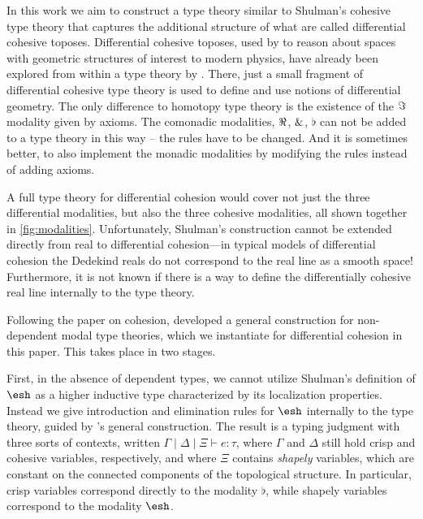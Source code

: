 \documentclass{article}
\begin{document}
In this work we aim to construct a type theory similar to Shulman's cohesive
type theory that captures the additional structure of what are called
differential cohesive toposes.  Differential cohesive toposes, used by \citet{Schreiber2013}
to reason about spaces with geometric structures of interest to modern physics,
have already been explored from within a type theory by \citet{Wellen2017}.
There, just a small fragment of differential cohesive type theory is used to
define and use notions of differential geometry. 
The only difference to homotopy type theory
 is the existence of the $\Im$ modality given by axioms.
The comonadic modalities, $\Re$, $\&$, $\flat$ can not be added to a type theory in this way -- 
the rules have to be changed.
And it is sometimes better, to also implement the monadic modalities by modifying the rules instead of adding axioms.

A full type theory for differential cohesion would cover not just the three
differential modalities, but also the three cohesive modalities, all shown
together in \cref{fig:modalities}. Unfortunately, Shulman's construction cannot
be extended directly from real to differential cohesion---in typical models of
differential cohesion the Dedekind reals do not correspond to the real line as a
smooth space! Furthermore, it is not known if there is a way to define the
differentially cohesive real line internally to the type theory. 

Following the \citeyear{Licata2016} paper on cohesion, \citet{Licata2017}
developed a general construction for non-dependent modal type theories, which we
instantiate for differential cohesion in this paper. This takes place in two
stages.

First, in the absence of dependent types, we cannot utilize Shulman's definition
of $\shape$ as a higher inductive type characterized by its localization
properties. Instead we give introduction and elimination rules for $\shape$
internally to the type theory, guided by \citeauthor{Licata2017}'s general
construction. The result is a typing judgment with three sorts of contexts,
written $\Gamma \mid \Delta \mid \Xi \vdash e : \tau$, where $\Gamma$ and
$\Delta$ still hold crisp and cohesive variables, respectively, and where $\Xi$
contains \emph{shapely} variables, which are constant on the connected
components of the topological structure. In particular, crisp variables
correspond directly to the modality $\flat$, while shapely variables correspond
to the modality $\shape$.
\end{document}
